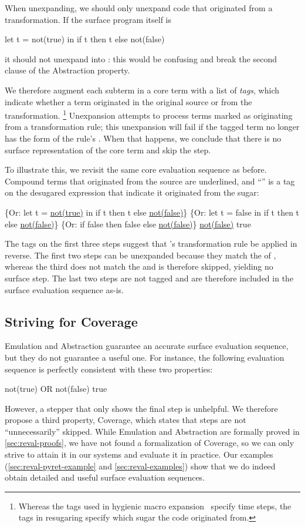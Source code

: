 When unexpanding, we should only unexpand code that
originated from a transformation. If the surface program itself is
\begin{Codes}
let t = not(true) in
  if t then t else not(false)
\end{Codes}
it should not unexpand into :
this would be confusing and break the second clause of the Abstraction property.

We therefore augment each subterm in a core term
with a list of \emph{tags}, which indicate whether a term
originated in the original source or from the transformation.%
\footnote{Whereas the tags used in hygienic macro
  expansion~\cite{hygienic-macros} specify time steps,
  the tags in resugaring specify which sugar the
  code originated from.}
Unexpansion attempts to process terms marked as
originating from a transformation rule; this
unexpansion will fail if the tagged term no longer has the form of
the rule's . When that happens, we conclude that there is no
surface representation of the core term and skip the step.

To illustrate this, we revisit the same core evaluation sequence as
before. Compound terms that originated from the source are underlined, and
``'' is a tag on the desugared expression that indicate it
originated from the  sugar:
\begin{Codes}
    \{Or: let t = \underline{not(true)} in
      if t then t else \underline{not(false)}\}
\CoreStep \{Or: let t = false in
      if t then t else \underline{not(false)}\}
\CoreStep \{Or: if false then false else \underline{not(false)}\}
\CoreStep \underline{not(false)}
\CoreStep true
\end{Codes}
The tags on the first three steps suggest that 's transformation
rule be applied in reverse. The first two steps can be unexpanded because
they match the  of , whereas the third
does not match the  and is therefore skipped,
yielding no surface step.  The last two steps are not tagged and are
therefore included in the surface evaluation sequence as-is.

\subsection{Striving for Coverage}

Emulation and Abstraction guarantee an accurate
surface evaluation sequence, but they do not guarantee a useful one. For
instance, the following evaluation sequence is perfectly consistent with
these two properties:
\begin{Codes}
    not(true) OR not(false)
\SurfStep true
\end{Codes}
However, a stepper that only shows the final step is unhelpful. We therefore
propose a third property, Coverage, which states that steps
are not ``unnecessarily'' skipped. While Emulation and
Abstraction are formally proved in \cref{sec:reval-proofs}, we have not found a
formalization of Coverage, so we can only strive to attain it in
our systems and evaluate it in practice. Our examples
(\cref{sec:reval-pyret-example} and \cref{sec:reval-examples}) show
that we do indeed obtain detailed and useful surface evaluation sequences.


